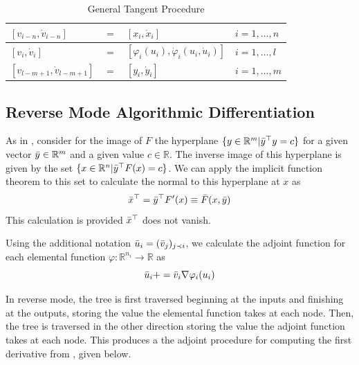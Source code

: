 \documentclass{article}
\begin{document}
\begin{table}[h]
    \centering
    \begin{tabular}{|lcll|}
        \hline
        $[v_{i-n}, \Dot{v}_{i-n}]$ & $=$ & $[x_{i}, \Dot{x}_{i}]$ & $i = 1, \ldots, n$ \\
        \hline
        $[v_{i}, \Dot{v}_{i}]$ & $=$ & $[\varphi_i (u_i), \Dot{\varphi}_i(u_i, \Dot{u}_i)]$ & $i = 1, \ldots, l$ \\
        \hline
        $[v_{l-m+1}, \Dot{v}_{l-m+1}]$ & $=$ & $[y_{i}, \Dot{y}_{i}]$ & $i = 1, \ldots, m$ \\
        \hline
    \end{tabular}
    \caption{General Tangent Procedure}
    \label{tab:gtp}
\end{table}

\subsection{Reverse Mode Algorithmic Differentiation}

As in \cite{dhamarticle}, consider for the image of $F$ the hyperplane $\{ y \in \mathbb{R}^m | \Bar{y}^\top y = c\}$ for a given vector $\Bar{y} \in \mathbb{R}^m$ and a given value $c \in \mathbb{R}$. The inverse image of this hyperplane is given by the set $\{ x \in \mathbb{R}^n | \Bar{y}^\top F(x) = c\}$. We can apply the implicit function theorem to this set to calculate the normal to this hyperplane at $x$ as
\begin{equation}
    \Bar{x}^\top = \Bar{y}^\top F'(x) \equiv \Bar{F}(x, \Bar{y})
\end{equation}
This calculation is provided $\Bar{x}^\top$ does not vanish.

Using the additional notation $\Bar{u}_i = (\Bar{v}_j)_{j \prec i}$, we calculate the adjoint function for each elemental function $\varphi : \mathbb{R}^{n_i} \longrightarrow \mathbb{R}$ as
\begin{equation}
    \Bar{u}_i += \Bar{v}_i \nabla \varphi_i (u_i)
\end{equation}

In reverse mode, the tree is first traversed beginning at the inputs and finishing at the outputs, storing the value the elemental function takes at each node. Then, the tree is traversed in the other direction storing the value the adjoint function takes at each node. This produces a the adjoint procedure for computing the first derivative from \cite{dhamarticle}, given below.
\end{document}

